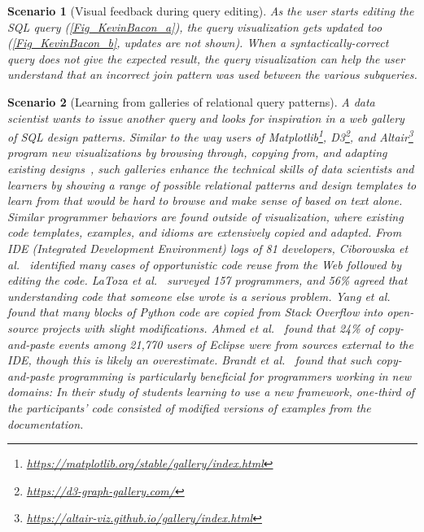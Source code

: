 \documentclass[letterpaper,11pt]{article}
\newtheorem{scenario}{Scenario}
\begin{document}
\begin{scenario}[Visual feedback during query editing]
	As the user starts editing the SQL query (\autoref{Fig_KevinBacon_a}), the query visualization gets updated too
	(\autoref{Fig_KevinBacon_b}, updates are not shown).
	When a syntactically-correct query does not give the expected result,
	the query visualization can help the user understand that an incorrect join pattern was used between the various subqueries. 
\end{scenario}	








\begin{scenario}[Learning from galleries of relational query patterns]
	A data scientist wants to issue another query and looks for inspiration in a \emph{web gallery of SQL design patterns}.
	Similar to the way users of Matplotlib\footnote{\url{https://matplotlib.org/stable/gallery/index.html}},
	 D3\footnote{\url{https://d3-graph-gallery.com/}}, 
	and Altair\footnote{\url{https://altair-viz.github.io/gallery/index.html}} 
	program new visualizations by browsing through, copying from, and adapting existing designs~\cite{10.1145/3503490}, 
	such galleries enhance the technical skills of data scientists and learners by 
	showing a range of possible relational patterns and design templates to learn from 
	that would be hard to browse and make sense of 
	based on text alone.
	Similar programmer behaviors are found outside of visualization, where existing code templates, examples, and idioms are extensively copied and adapted.
	From IDE (Integrated Development Environment) logs of 81 developers, 
	Ciborowska et al.\ \cite{Ciborowska2018} identified many cases of opportunistic code reuse from the Web
	followed by editing the code. 
	LaToza et al.~\cite{Latoza2006} surveyed 157 programmers, 
	and 56\% agreed that understanding code that someone else wrote is a serious problem.
	Yang et al.~\cite{Yang2017} found that many blocks of Python code are copied from Stack Overflow 
	into open-source projects with slight modifications. 
	Ahmed et al.~\cite{Ahmed2015} found that 24\%
	of copy-and-paste events 
	among 21,770 users of Eclipse were from sources external to the IDE, though this is likely an overestimate. 
	Brandt et al.~\cite{Brandt2009} found that such copy-and-paste programming is particularly beneficial for programmers working in new domains:
	In their study of students learning to use a new framework, one-third of the participants' code consisted of modified versions of examples from the documentation. 


\end{scenario}
\end{document}

